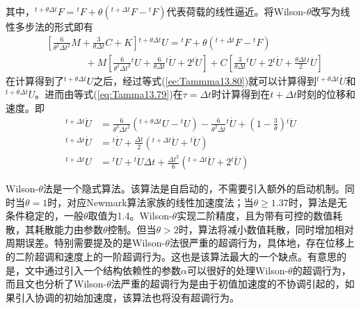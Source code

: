 其中，${^{t+\theta\Delta t}\!F}={^t\!F}+\theta({^{t+\Delta t}\!F}-{^t\!F})$代表荷载的线性逼近。将Wilson-$\theta$改写为线性多步法的形式即有
\begin{equation}
\begin{split}
&\left[\frac{6}{\theta^2\Delta t^2}M+\frac{3}{\theta\Delta t}C+K\right]{^{t+\theta\Delta t}\!U}={^t\!F}+\theta({^{t+\Delta t}\!F}-{^t\!F})\\
&\qquad\qquad+M\left[\frac{6}{\theta^2\Delta t^2}{^t\!U}+\frac{6}{\theta\Delta t}{^t\!\dot{U}}+2{^t\!\ddot{U}}\right]+C\left[\frac{3}{\theta\Delta t}{^t\!U}+2{^t\!\dot{U}}+\frac{\theta\Delta t}{2}{^t\!\ddot{U}}\right]
\end{split}
\end{equation}
在计算得到了${^{t+\theta\Delta t}\!U}$之后，经过等式(\ref{ee:Tammma13.80})就可以计算得到${^{t+\theta\Delta t}\!\dot{U}}$和${^{t+\theta\Delta t}\!\ddot{U}}$。进而由等式(\ref{eq:Tamma13.79})在$\tau=\Delta t$时计算得到在$t+\Delta t$时刻的位移和速度。即
\begin{subequations}
\begin{align}
{^{t+\Delta t}\!\ddot{U}}&=\frac{6}{\theta^3\Delta t^2}({^{t+\theta\Delta t}\!U}-{^t\!U})-\frac{6}{\theta^2\Delta t}{^t\!\dot{U}}+\left(1-\frac{3}{\theta}\right){^t\!\ddot{U}}\\
{^{t+\Delta t}\!\dot{U}}&={^t\!\dot{U}}+\frac{\Delta t}{2}({^{t+\Delta t}\!\ddot{U}}+{^t\!\ddot{U}})\\
{^{t+\Delta t}\!U}&={^t\!U}+{^t\!\dot{U}}\Delta t+\frac{\Delta t^2}{6}({^{t+\Delta t}\!\ddot{U}}+2{^t\!\ddot{U}})
\end{align}
\end{subequations}

Wilson-$\theta$法是一个隐式算法。该算法是自启动的，不需要引入额外的启动机制。同时当$\theta=1$时，对应Newmark算法家族的线性加速度法；当$\theta\ge1.37$时，算法是无条件稳定的，一般$\theta$取值为1.4。Wilson-$\theta$实现二阶精度，且为带有可控的数值耗散，其耗散能力由参数$\theta$控制。但当$\theta>2$时，算法将减小数值耗散，同时增加相对周期误差。特别需要提及的是Wilson-$\theta$法很严重的超调行为\cite{Zhou2004c}，具体地，存在位移上的二阶超调和速度上的一阶超调行为。这也是该算法最大的一个缺点。有意思的是，文中通过引入一个结构依赖性的参数$\alpha$可以很好的处理Wilson-$\theta$的超调行为，而且文也分析了Wilson-$\theta$法严重的超调行为是由于初值加速度的不协调引起的，如果引入协调的初始加速度，该算法也将没有超调行为。

